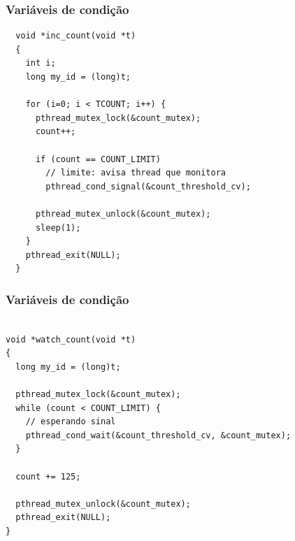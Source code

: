 \documentclass[xcolor=dvipsnames,11pt,presentation,aspectratio=169]{beamer}
\begin{document}
\begin{frame}[fragile]
  \frametitle{Variáveis de condição}
  \vspace{-5mm}
\begin{lstlisting}
  void *inc_count(void *t) 
  {
    int i;
    long my_id = (long)t;
  
    for (i=0; i < TCOUNT; i++) {
      pthread_mutex_lock(&count_mutex);
      count++;
  
      if (count == COUNT_LIMIT)
        // limite: avisa thread que monitora
        pthread_cond_signal(&count_threshold_cv);

      pthread_mutex_unlock(&count_mutex);
      sleep(1);
    }
    pthread_exit(NULL);
  }
\end{lstlisting}
\end{frame}
\begin{frame}[fragile]
  \frametitle{Variáveis de condição}
\begin{lstlisting}

void *watch_count(void *t) 
{
  long my_id = (long)t;

  pthread_mutex_lock(&count_mutex);
  while (count < COUNT_LIMIT) {
    // esperando sinal
    pthread_cond_wait(&count_threshold_cv, &count_mutex);
  }
  
  count += 125;

  pthread_mutex_unlock(&count_mutex);
  pthread_exit(NULL);
}

\end{lstlisting}
\end{frame}

\end{document}
